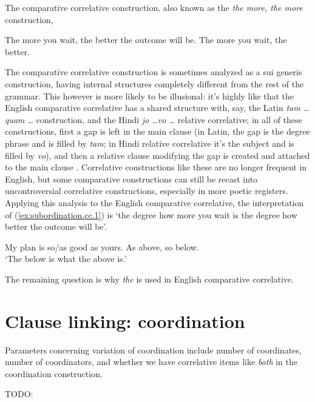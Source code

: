 \documentclass[UTF8, a4paper, oneside, scheme=plain, 12pt]{ctexbook}
\newcommand*{\citepage}[1]{p.~{#1}}
\newcommand{\form}[1]{\emph{#1}}
\newcommand{\translate}[1]{`#1'}
\begin{document}
The comparative correlative construction, 
also known as the \form{the more, the more} construction, 

\begin{exe}
    \ex\label{ex:subordination.cc.1} The more you wait, the better the outcome will be. 
    \ex The more you wait, the better. 
\end{exe}

The comparative correlative construction 
is sometimes analyzed as a sui generis construction, 
having internal structures completely different from the rest of the grammar. 
This however is more likely to be illusional: 
it's highly like that the English comparative correlative 
has a shared structure with, say, 
the Latin \form{tam \dots quam \dots} construction, 
and the Hindi \form{jo \dots vo \dots} relative correlative; 
in all of these constructions, 
first a gap is left in the main clause
(in Latin, the gap is the degree phrase and is filled by \form{tam};
in Hindi relative correlative it's the subject and is filled by \form{vo}),
and then a relative clause modifying the gap is created 
and attached to the main clause \citep{den2005comparative}. 
Correlative constructions like these are no longer frequent in English,
but some comparative constructions 
can still be recast into uncontroversial correlative constructions,
especially in more poetic registers. 
Applying this analysis to the English comparative correlative, 
the interpretation of (\ref{ex:subordination.cc.1})
is \translate{the degree how more you wait is the degree how better the outcome will be}.

\begin{exe}
    \ex My plan is so/as good as yours. 
    \ex As above, so below. \\ 
    \translate{The below is what the above is.} 
    \ex 
\end{exe}

The remaining question is why \form{the} is used in English comparative correlative.

\section{Clause linking: coordination}\label{sec:clause-linking.coordination}

Parameters concerning variation of coordination 
include number of coordinates, 
number of coordinators,
and whether we have correlative items like \form{both} in the coordination construction.

TODO: \citet[\citepage{1276}]{cgel}
\end{document}
